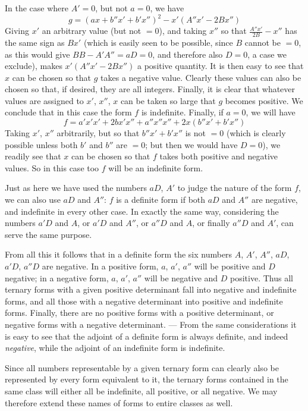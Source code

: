In the case where $A'=0$, but not $a=0$, we have
\[
g=(ax+b''x'+b'x'')^2-x'(A''x'-2Bx'')
\]
Giving $x'$ an arbitrary value (but not $=0$), and taking $x''$ so that $\frac{A''x'}{2B}-x''$ has the same sign as $Bx'$ (which is easily seen to be possible, since $B$ cannot be $=0$, as this would give $BB-A'A''=aD=0$, and therefore also $D=0$, a case we exclude), makes $x'(A''x'-2Bx'')$ a positive quantity. It is then easy to see that $x$ can be chosen so that $g$ takes a negative value. Clearly these values can also be chosen so that, if desired, they are all integers. Finally, it is clear that whatever values are assigned to $x'$, $x''$, $x$ can be taken so large that $g$ becomes positive. We conclude that in this case the form $f$ is indefinite.
Finally, if \(a=0\), we will have
\[
f=a'x'x'+2bx'x''+a''x''x''+2x(b''x'+b'x'')
\]
Taking \(x'\), \(x''\) arbitrarily, but so that \(b''x'+b'x''\) is not \(=0\) (which is clearly possible unless both \(b'\) and \(b''\) are \(=0\); but then we would have \(D=0\)), we readily see that \(x\) can be chosen so that \(f\) takes both positive and negative values. So in this case too \(f\) will be an indefinite form.

Just as here we have used the numbers \(aD\), \(A'\) to judge the nature of the form \(f\), we can also use \(aD\) and \(A''\): \(f\) is a definite form if both \(aD\) and \(A''\) are negative, and indefinite in every other case. In exactly the same way, considering the numbers \(a'D\) and \(A\), or \(a'D\) and \(A''\), or \(a''D\) and \(A\), or finally \(a''D\) and \(A'\), can serve the same purpose.

From all this it follows that in a definite form the six numbers \(A\), \(A'\), \(A''\), \(aD\), \(a'D\), \(a''D\) are negative. In a positive form, \(a\), \(a'\), \(a''\) will be positive and \(D\) negative; in a negative form, \(a\), \(a'\), \(a''\) will be negative and \(D\) positive. Thus all ternary forms with a given positive determinant fall into negative and indefinite forms, and all those with a negative determinant into positive and indefinite forms. Finally, there are no positive forms with a positive determinant, or negative forms with a negative determinant. --- From the same considerations it is easy to see that the adjoint of a definite form is always definite, and indeed \emph{negative}, while the adjoint of an indefinite form is indefinite.

Since all numbers representable by a given ternary form can clearly also be represented by every form equivalent to it, the ternary forms contained in the same class will either all be indefinite, all positive, or all negative. We may therefore extend these names of forms to entire classes as well.
